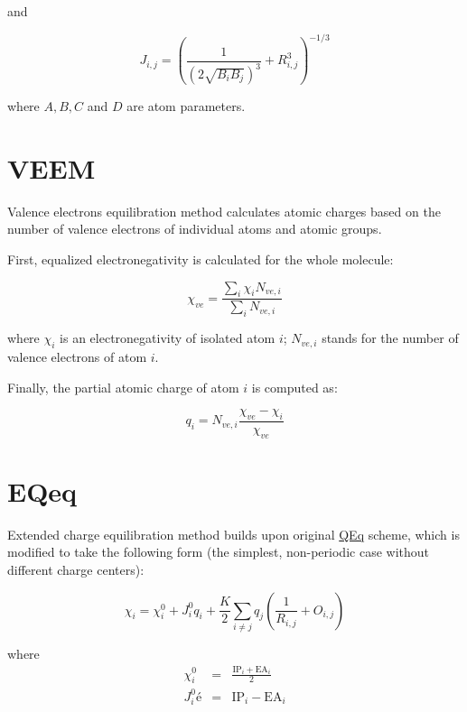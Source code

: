 \documentclass[oneside]{memoir}
\newcommand\ddfrac[2]{\frac{\displaystyle #1}{\displaystyle #2}}
\begin{document}
and

\begin{equation}
\label{eq:smpqeq_J}
J_{i, j} = \left(\ddfrac{1}{(2\sqrt{B_iB_j})^3} + R_{i,j}^3\right)^{-1/3}
\end{equation}

where $A, B, C$ and $D$ are atom parameters.

\section*{VEEM}
\label{sec:methods_veem}

Valence electrons equilibration method \cite{Wu2011} calculates atomic charges based on the number of valence electrons of individual atoms and atomic groups.

First, equalized electronegativity is calculated for the whole molecule:

\begin{equation}
\label{eq:veem_en}
\chi_{ve} = \ddfrac{\sum_i \chi_iN_{ve, i}}{\sum_i N_{ve, i}}
\end{equation}

where $\chi_i$ is an electronegativity of isolated atom $i$; $N_{ve, i}$ stands for the number of valence electrons of atom $i$.

Finally, the partial atomic charge of atom $i$ is computed as:

\begin{equation}
\label{eq:veem_q}
q_i = N_{ve, i}\ddfrac{\chi_{ve} - \chi_i}{\chi_{ve}}
\end{equation}

\section*{EQeq}
\label{sec:methods_eqeq}
Extended charge equilibration method \cite{Wilmer2012} builds upon original \hyperref[sec:methods_qeq]{QEq} scheme, which is modified to take the following form (the simplest, non-periodic case without different charge centers):

\begin{equation}
\label{eq:eqeq_main}
\chi_i = \chi_i^0 + J_i^0q_i + \ddfrac{K}{2}\sum_{i \neq j} q_j\left(\ddfrac{1}{R_{i, j}} + O_{i, j}\right)
\end{equation}

where
\begin{eqnarray}
\label{eq:eqeq_default}
\chi_i^0 &=& \ddfrac{\mathrm{IP}_i + \mathrm{EA}_i}{2}\\
J_i^0 é &=& \mathrm{IP}_i - \mathrm{EA}_i
\end{eqnarray}
\end{document}
